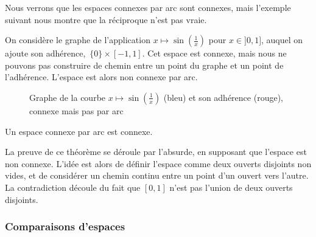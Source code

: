 Nous verrons que les espaces connexes par arc sont connexes, mais l'exemple suivant nous montre que la réciproque n'est pas vraie.

\begin{exemple}
On considère le graphe de l'application $x\mapsto\sin\left(\frac{1}{x}\right)$ pour $x\in]0,1]$, auquel on ajoute son adhérence,~$\{0\}\times[-1,1]$. Cet espace est connexe, mais nous ne pouvons pas construire de chemin entre un point du graphe et un point de l'adhérence. L'espace est alors non connexe par arc.
\begin{figure}[h]
    \centering
{}
\label{tkz:non-path-connected}
\caption{Graphe de la courbe $x\mapsto\sin\left(\frac{1}{x}\right)$ (bleu) et son adhérence (rouge), connexe mais pas par arc}
\end{figure}
\end{exemple}


\begin{theorem}
Un espace connexe par arc est connexe.
\end{theorem}
La preuve de ce théorème se déroule par l'absurde, en supposant que l'espace est non connexe. L'idée est alors de définir l'espace comme deux ouverts disjoints non vides, et de considérer un chemin continu entre un point d'un ouvert vers l'autre. La contradiction découle du fait que $[0,1]$ n'est pas l'union de deux ouverts disjoints.

\subsubsection{Comparaisons d'espaces}

